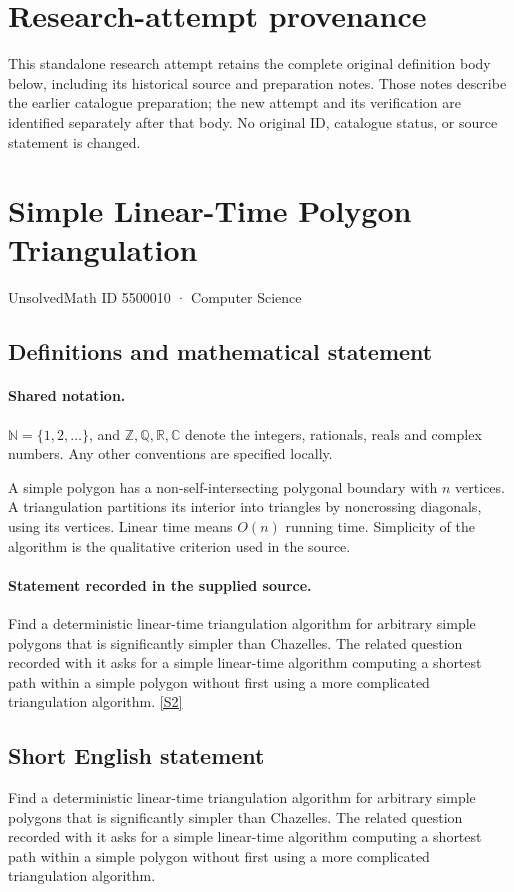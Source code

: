 \documentclass[11pt]{article}
\begin{document}
\section*{Research-attempt provenance}
This standalone research attempt retains the complete original definition body below,
including its historical source and preparation notes. Those notes describe the
earlier catalogue preparation; the new attempt and its verification are identified
separately after that body. No original ID, catalogue status, or source statement is changed.

\section{Simple Linear-Time Polygon Triangulation}\label{5500010}
{\small UnsolvedMath ID 5500010 · Computer Science}
\subsection{Definitions and mathematical statement}

\paragraph{Shared notation.}$\mathbb N=\{1,2,\ldots\}$, and $\mathbb Z,\mathbb Q,\mathbb R,\mathbb C$ denote the integers, rationals, reals and complex numbers. Any other conventions are specified locally.


A simple polygon has a non-self-intersecting polygonal boundary with $n$ vertices. A triangulation partitions its interior into triangles by noncrossing diagonals, using its vertices. Linear time means $O(n)$ running time. Simplicity of the algorithm is the qualitative criterion used in the source.
\paragraph{Statement recorded in the supplied source.}
Find a deterministic linear-time triangulation algorithm for arbitrary simple polygons that is significantly simpler than Chazelle\textquotesingle s. The related question recorded with it asks for a simple linear-time algorithm computing a shortest path within a simple polygon without first using a more complicated triangulation algorithm. \href{https://github.com/edemaine/topp/blob/main/Problems/P.000010}{[S2]}
\subsection{Short English statement}
Find a deterministic linear-time triangulation algorithm for arbitrary simple polygons that is significantly simpler than Chazelle\textquotesingle s. The related question recorded with it asks for a simple linear-time algorithm computing a shortest path within a simple polygon without first using a more complicated triangulation algorithm.
\end{document}
